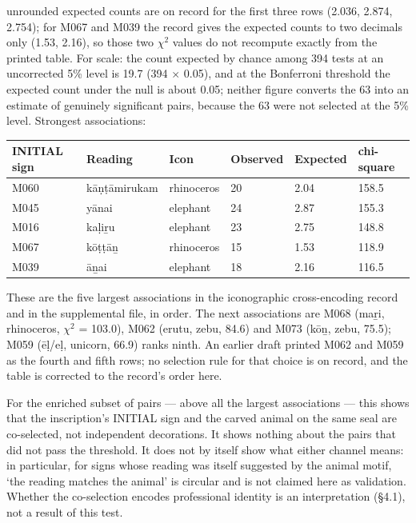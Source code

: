 \documentclass[11pt]{article}
\newcounter{none} %
\begin{document}
unrounded expected counts are on record for the first three rows (2.036, 2.874, 2.754); for M067 and M039 the record gives the expected counts to two decimals only (1.53, 2.16), so those two $\chi^2$ values do not recompute exactly from the printed table. For scale: the count expected by chance among 394 tests at an uncorrected 5\% level is 19.7 (394 $\times$ 0.05), and at the Bonferroni threshold the expected count under the null is about 0.05; neither figure converts the 63 into an estimate of genuinely significant pairs, because the 63 were not selected at the 5\% level. Strongest
associations:

{\def\LTcaptype{none} %
\begin{longtable}[]{@{}llllll@{}}
\toprule\noalign{}
INITIAL sign & Reading & Icon & Observed & Expected & chi-square \\
\midrule\noalign{}
\endhead
\bottomrule\noalign{}
\endlastfoot
M060 & kāṇṭāmirukam & rhinoceros & 20 & 2.04 & 158.5 \\
M045 & yānai & elephant & 24 & 2.87 & 155.3 \\
M016 & kaḷiṟu & elephant & 23 & 2.75 & 148.8 \\
M067 & kōṭṭāṉ & rhinoceros & 15 & 1.53 & 118.9 \\ 
M039 & āṉai & elephant & 18 & 2.16 & 116.5 \\
\end{longtable}
}

These are the five largest associations in the iconographic cross-encoding record and in the supplemental file, in order. The next associations are M068 (maṟi, rhinoceros, $\chi^2$ = 103.0), M062 (erutu, zebu, 84.6) and M073 (kōṉ, zebu, 75.5); M059 (ēḷ/eḷ, unicorn, 66.9) ranks ninth. An earlier draft printed M062 and M059 as the fourth and fifth rows; no selection rule for that choice is on record, and the table is corrected to the record's order here.

For the enriched subset of pairs --- above all the largest associations --- this shows that the inscription's INITIAL sign and the carved animal on the same seal are co-selected, not independent decorations. It shows nothing about the pairs that did not pass the threshold. It does not by itself show what either channel means: in particular, for signs whose reading was itself suggested by the animal motif, `the reading matches the animal' is circular and is not claimed here as validation. Whether the co-selection encodes professional identity is an interpretation (§4.1), not a result of this test.
\end{document}
